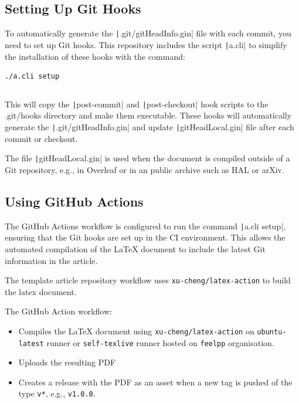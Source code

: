 \documentclass[a4paper]{article}
\begin{document}
\subsection{Setting Up Git Hooks}

To automatically generate the \texttt|.git/gitHeadInfo.gin| file with each commit, you need to set up Git hooks.
This repository includes the script \texttt|a.cli| to simplify the installation of these hooks with the command:

\begin{verbatim}
./a.cli setup
\end{verbatim}

\inputminted[linenos,autogobble,bgcolor=background,fontsize=\small,firstline=6,lastline=23]{sh}{a.cli}

This will copy the \texttt|post-commit| and \texttt|post-checkout| hook scripts to the .git/hooks directory and make them executable.
These hooks will automatically generate the \texttt|.git/gitHeadInfo.gin| and update \texttt|gitHeadLocal.gin| file after each commit or checkout.

The file \texttt|gitHeadLocal.gin| is used when the document is compiled outside of a Git repository, e.g., in Overleaf or in an public archive such as HAL or arXiv.


\subsection{Using GitHub Actions}

The GitHub Actions workflow is configured to run the command \texttt|a.cli setup|, ensuring that the Git hooks are set up in the CI environment.
This allows the automated compilation of the \LaTeX{} document to include the latest Git information in the article.

The template article repository workflow uses \citep{cheng_xu_xu-chenglatex-action_2024} \texttt{xu-cheng/latex-action} to build the latex document.

The GitHub Action workflow:
\begin{itemize}
    \item Compiles the \LaTeX{} document using \texttt{xu-cheng/latex-action} on \texttt{ubuntu-latest} runner or \texttt{self-texlive} runner hosted on \texttt{feelpp} organisation.
    \item Uploads the resulting PDF
    \item Creates a release with the PDF as an asset when a new tag is pushed of the type \texttt{v*}, e.g., \texttt{v1.0.0}.
\end{itemize}
\end{document}
